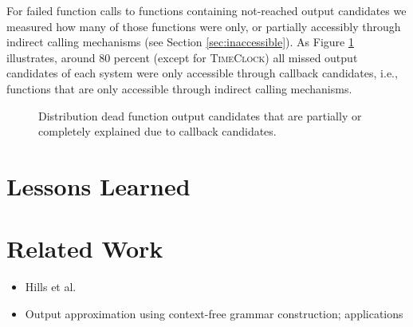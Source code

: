 \documentclass[preprint]{sig-alternate-05-2015}
\begin{document}
For failed function calls to functions containing not-reached output candidates we measured how many of those functions were only, or partially accessibly through indirect calling mechanisms (see Section \ref{sec:inaccessible}). As Figure \ref{fig:output_candidate_explanation} illustrates, around 80 percent (except for \textsc{TimeClock}) all missed output candidates of each system were only accessible through callback candidates, i.e., functions that are only accessible through indirect calling mechanisms.

\begin{figure}[p]
	
	\caption{Distribution dead function output candidates that are partially or
	completely explained due to callback candidates.}
	\label{fig:output_candidate_explanation}
\end{figure}



\section{Lessons Learned}

\section{Related Work}
\begin{itemize}
	\item Hills et al. \cite{Hills:2013:ESP:2483760.2483786}
	\item Output approximation using context-free grammar construction; applications \cite{minamide2005static,wassermann2007sound}
\end{itemize}



\end{document}
